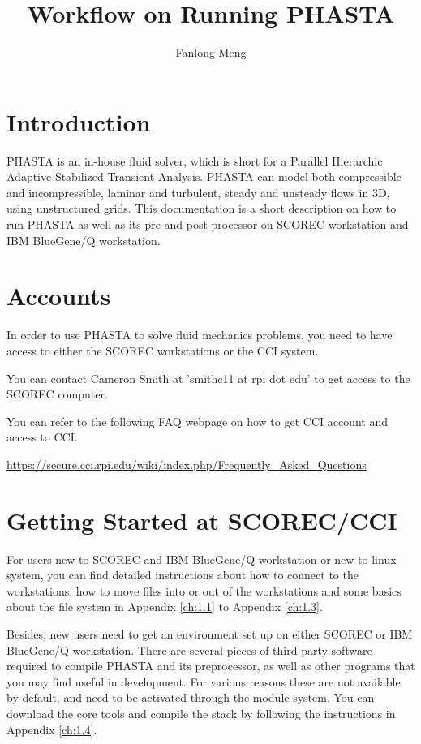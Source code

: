 \documentclass{article}
\title{Workflow on Running PHASTA}
\author{Fanlong Meng}
\begin{document}
\lstset{style=myc}

\maketitle

\section{Introduction}

PHASTA is an in-house fluid solver, which is short for a Parallel Hierarchic Adaptive Stabilized Transient Analysis. PHASTA can model both compressible and incompressible, laminar and turbulent, steady and unsteady flows in 3D, using unstructured grids. This documentation is a short description on how to run PHASTA as well as its pre and post-processor on SCOREC workstation and IBM BlueGene/Q workstation. 

\section{Accounts}

In order to use PHASTA to solve fluid mechanics problems, you need to have access to either the SCOREC workstations or the CCI system.

You can contact Cameron Smith at 'smithc11 at rpi dot edu' to get access to the SCOREC computer. 

You can refer to the following FAQ webpage on how to get CCI account and access to CCI.


\url{https://secure.cci.rpi.edu/wiki/index.php/Frequently_Asked_Questions}

\section{Getting Started at SCOREC/CCI}

For users new to SCOREC and IBM BlueGene/Q workstation or new to linux system, you can find detailed instructions about how to connect to the workstations, how to move files into or out of the workstations and some basics about the file system in Appendix \ref{ch:1.1} to Appendix \ref{ch:1.3}.

Besides, new users need to get an environment set up on either SCOREC or IBM BlueGene/Q workstation. There are several pieces of third-party software required to compile PHASTA and its preprocessor, as well as other programs that you may find useful in development. For various reasons these are not available by default, and need to be activated through the module system. You can download the core tools and compile the stack by following the instructions in Appendix \ref{ch:1.4}.
\end{document}
